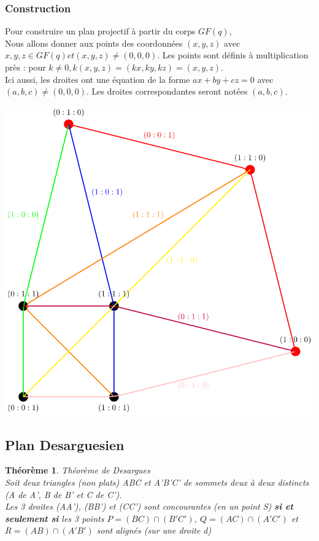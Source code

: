 \documentclass[a4paper]{article}
\newtheorem{Th}[Def]{Théorème}
\begin{document}
\subsubsection*{Construction}
Pour construire un plan projectif à partir du corps $GF(q)$,\\
Nous allons donner aux points des coordonnées $(x,y,z)$ avec $x,y,z \in GF(q) et (x,y,z) \neq (0,0,0)$. Les points sont définis à multiplication près : pour $k \neq 0, k(x,y,z) = (kx,ky,kz) = (x,y,z)$.\\
Ici aussi, les droites ont une équation de la forme $ax + by + cz = 0$ avec $(a,b,c) \neq (0,0,0)$. Les droites correspondantes seront notées $(a,b,c)$.
\begin{center}
  \includegraphics[scale=0.5]{droitestikz.pdf}
  \end{center}

\subsection{Plan Desarguesien}

\begin{Th}{Th\'eor\`eme de Desargues}\\
  Soit deux triangles (non plats) ABC et A'B'C' de sommets deux à deux distincts (A de A', B de B' et C de C'). \\
  Les 3 droites (AA'), (BB') et (CC') sont concourantes (en un point S) \textbf{si et seulement si} les 3 points $P = (BC) \cap (B'C')$, $Q = (AC) \cap (A'C')$ et $R = (AB) \cap (A'B')$ sont alignés (sur une droite d)
  \end{Th}
\end{document}
